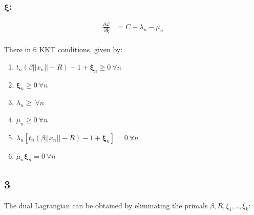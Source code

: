 \documentclass[a4paper]{article}
\begin{document}
\subsubsection*{$\pmb{\xi}$:}
\begin{align*}
    \frac{\partial \mathcal{L}}{\partial \pmb{\xi}} &= C - \lambda_{n} - \mu_{n}\\
\end{align*}

There in 6 KKT conditions,  given by:
\begin{enumerate}
    \item $t_{n}(\beta||x_{n}|| - R) - 1 + \pmb{\xi}_{n} \geq 0  \ \forall n$
    \item $\pmb{\xi}_{n} \geq 0 \ \forall n$
    \item $\lambda_{n}  \geq \ \forall n$
    \item $ \mu_{n} \geq 0  \ \forall n$
    \item $\lambda_{n}[t_{n}(\beta||x_{n}|| - R) - 1 + \pmb{\xi}_{n}] = 0  \ \forall n$
    \item $\mu_{n}\pmb{\xi}_{n} = 0 \ \forall n$
\end{enumerate}

\subsection*{3}
The dual Lagrangian can be obtained by eliminating the primals ${\beta, R, \xi_{1},..,\xi_{k}}$:
\end{document}
